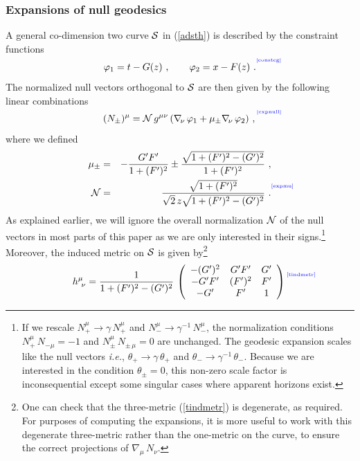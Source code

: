 \documentclass[12pt]{article}
\newcommand{\be}{\begin{equation}}
\newcommand{\ee}{\end{equation}}
\def\req#1{(\ref{#1})}
\def\ie{{\it i.e.}}
\def\vp{\varphi}
\def\s{\sigma}
\def\CS{{\cal S}}
\def\f#1#2{{\frac{#1}{#2}}}
\def\f#1#2{{\frac{#1}{#2}}}
\def\Label#1{\label{#1}%
{ \color{blue}{\smash{\hbox to0pt{\raise2ex\hbox{\tiny[#1]}\hss}}}}}
\def\ms{\CS}
\def\s{\sqrt}
\def\f {\frac}
\def\vp{\varphi}
\begin{document}
\subsubsection{Expansions of null geodesics}

A general co-dimension two curve $\ms$ in \req{adsth} is described by the
constraint functions
%
\be \vp_1=t-G(z) \ , \qquad \vp_2=x-F(z) \ .
\Label{constcg}\ee
%
The normalized null vectors orthogonal to $\ms$ are then given by
the following linear combinations
%
\begin{equation}
(N_{\pm})^{\mu} = {\cal N} \,  g^{\mu\nu}\, (\nabla_{\! \nu} \,
\vp_1+\mu_{\pm}\nabla_{\! \nu} \, \vp_2) \ ,
\Label{expnull}
\end{equation}
%
where we defined
%
\begin{eqnarray}
\mu_{\pm} &=& -\f{G'F'}{1+(F')^2} \pm \f{\s{1+(F')^2-(G')^2}}{1+(F')^2} \ , \nonumber\\
{\cal N} &=& \f{\s{1+(F')^2}}{\s{2}\,z\s{1+(F')^2-(G')^2}} \ .
\Label{expmu}
\end{eqnarray}
%
As explained earlier, we will ignore the overall normalization
${\cal N}$ of the null vectors in most parts of this paper as we are
only interested in their signs.\footnote{If we rescale $N_+^\mu\to
\gamma \, N_+^\mu$ and $N_-^\mu\to \gamma^{-1}\, N_-^\mu$, the
normalization conditions $N_{+}^\mu\, N_{-\mu}=-1$ and
$N_{\pm}^\mu\, N_{\pm\, \mu}=0$ are unchanged. The geodesic
expansion  scales like the null vectors \ie, $\theta_+\to \gamma\,
\theta_+$ and $\theta_-\to \gamma^{-1}\, \theta_-$. Because we are
interested in the condition $\theta_{\pm} =0$, this non-zero scale
factor is inconsequential except some singular cases where apparent
horizons exist.} Moreover, the induced metric on $\ms$ is
given by\footnote{One can check that the three-metric \req{tindmetr}
is degenerate, as required. For purposes of computing the
expansions, it is more useful to work with this degenerate
three-metric rather than the one-metric on the curve, to ensure the
correct projections of $\nabla_{\! \mu} \, N_\nu$.}
%
\begin{equation}
h^\mu_{\ \nu}= \f{1}{1+(F')^2-(G')^2}  \, \left(\begin{array}{ccc}
  -(G')^2 & G'F' & G'\\
  -G'F' & (F')^2 & F' \\
   -G' & F' & 1
\end{array}\right)
\Label{tindmetr}
\end{equation}
%
\end{document}
